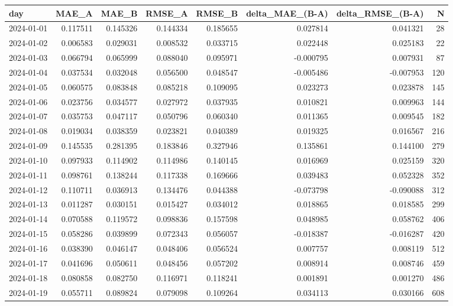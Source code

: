 \begin{tabular}{lrrrrrrr}
\toprule
day & MAE_A & MAE_B & RMSE_A & RMSE_B & delta_MAE_(B-A) & delta_RMSE_(B-A) & N \\
\midrule
2024-01-01 & 0.117511 & 0.145326 & 0.144334 & 0.185655 & 0.027814 & 0.041321 & 28 \\
2024-01-02 & 0.006583 & 0.029031 & 0.008532 & 0.033715 & 0.022448 & 0.025183 & 22 \\
2024-01-03 & 0.066794 & 0.065999 & 0.088040 & 0.095971 & -0.000795 & 0.007931 & 87 \\
2024-01-04 & 0.037534 & 0.032048 & 0.056500 & 0.048547 & -0.005486 & -0.007953 & 120 \\
2024-01-05 & 0.060575 & 0.083848 & 0.085218 & 0.109095 & 0.023273 & 0.023878 & 145 \\
2024-01-06 & 0.023756 & 0.034577 & 0.027972 & 0.037935 & 0.010821 & 0.009963 & 144 \\
2024-01-07 & 0.035753 & 0.047117 & 0.050796 & 0.060340 & 0.011365 & 0.009545 & 182 \\
2024-01-08 & 0.019034 & 0.038359 & 0.023821 & 0.040389 & 0.019325 & 0.016567 & 216 \\
2024-01-09 & 0.145535 & 0.281395 & 0.183846 & 0.327946 & 0.135861 & 0.144100 & 279 \\
2024-01-10 & 0.097933 & 0.114902 & 0.114986 & 0.140145 & 0.016969 & 0.025159 & 320 \\
2024-01-11 & 0.098761 & 0.138244 & 0.117338 & 0.169666 & 0.039483 & 0.052328 & 352 \\
2024-01-12 & 0.110711 & 0.036913 & 0.134476 & 0.044388 & -0.073798 & -0.090088 & 312 \\
2024-01-13 & 0.011287 & 0.030151 & 0.015427 & 0.034012 & 0.018865 & 0.018585 & 299 \\
2024-01-14 & 0.070588 & 0.119572 & 0.098836 & 0.157598 & 0.048985 & 0.058762 & 406 \\
2024-01-15 & 0.058286 & 0.039899 & 0.072343 & 0.056057 & -0.018387 & -0.016287 & 420 \\
2024-01-16 & 0.038390 & 0.046147 & 0.048406 & 0.056524 & 0.007757 & 0.008119 & 512 \\
2024-01-17 & 0.041696 & 0.050611 & 0.048456 & 0.057202 & 0.008914 & 0.008746 & 459 \\
2024-01-18 & 0.080858 & 0.082750 & 0.116971 & 0.118241 & 0.001891 & 0.001270 & 486 \\
2024-01-19 & 0.055711 & 0.089824 & 0.079098 & 0.109264 & 0.034113 & 0.030166 & 608 \\

\end{tabular}
